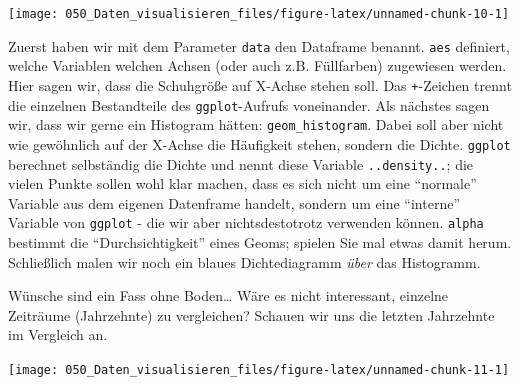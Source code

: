\documentclass[12pt,ngerman,]{book}
\makeatletter
\newenvironment{Shaded}{\begin{snugshade}}{\end{snugshade}}
\newcommand{\KeywordTok}[1]{\textcolor[rgb]{0.13,0.29,0.53}{\textbf{#1}}}
\newcommand{\DataTypeTok}[1]{\textcolor[rgb]{0.13,0.29,0.53}{#1}}
\newcommand{\DecValTok}[1]{\textcolor[rgb]{0.00,0.00,0.81}{#1}}
\newcommand{\StringTok}[1]{\textcolor[rgb]{0.31,0.60,0.02}{#1}}
\newcommand{\OperatorTok}[1]{\textcolor[rgb]{0.81,0.36,0.00}{\textbf{#1}}}
\newcommand{\NormalTok}[1]{#1}
\newenvironment{kframe}{%
\medskip{}
\setlength{\fboxsep}{.8em}
 \def\at@end@of@kframe{}%
 \ifinner\ifhmode%
  \def\at@end@of@kframe{\end{minipage}}%
  \begin{minipage}{\columnwidth}%
 \fi\fi%
 \def\FrameCommand##1{\hskip\@totalleftmargin \hskip-\fboxsep
 \colorbox{shadecolor}{##1}\hskip-\fboxsep
     \hskip-\linewidth \hskip-\@totalleftmargin \hskip\columnwidth}%
 \MakeFramed {\advance\hsize-\width
   \@totalleftmargin\z@ \linewidth\hsize
   \@setminipage}}%
 {\par\unskip\endMakeFramed%
 \at@end@of@kframe}
\renewenvironment{Shaded}{\begin{kframe}}{\end{kframe}}
\theoremstyle{definition}
\theoremstyle{definition}
\theoremstyle{remark}
\makeatother
\begin{document}
\begin{center}\texttt{[image: 050\_Daten\_visualisieren\_files/figure-latex/unnamed-chunk-10-1]} \end{center}

Zuerst haben wir mit dem Parameter \texttt{data} den Dataframe benannt.
\texttt{aes} definiert, welche Variablen welchen Achsen (oder auch z.B.
Füllfarben) zugewiesen werden. Hier sagen wir, dass die Schuhgröße auf
X-Achse stehen soll. Das \texttt{+}-Zeichen trennt die einzelnen
Bestandteile des \texttt{ggplot}-Aufrufs voneinander. Als nächstes sagen
wir, dass wir gerne ein Histogram hätten: \texttt{geom\_histogram}.
Dabei soll aber nicht wie gewöhnlich auf der X-Achse die Häufigkeit
stehen, sondern die Dichte. \texttt{ggplot} berechnet selbständig die
Dichte und nennt diese Variable \texttt{..density..}; die vielen Punkte
sollen wohl klar machen, dass es sich nicht um eine ``normale'' Variable
aus dem eigenen Datenframe handelt, sondern um eine ``interne'' Variable
von \texttt{ggplot} - die wir aber nichtsdestotrotz verwenden können.
\texttt{alpha} bestimmt die ``Durchsichtigkeit'' eines Geoms; spielen
Sie mal etwas damit herum. Schließlich malen wir noch ein blaues
Dichtediagramm \emph{über} das Histogramm.

Wünsche sind ein Fass ohne Boden\ldots{} Wäre es nicht interessant,
einzelne Zeiträume (Jahrzehnte) zu vergleichen? Schauen wir uns die
letzten Jahrzehnte im Vergleich an.

\begin{Shaded}
\end{Shaded}

\begin{center}\texttt{[image: 050\_Daten\_visualisieren\_files/figure-latex/unnamed-chunk-11-1]} \end{center}
\end{document}
